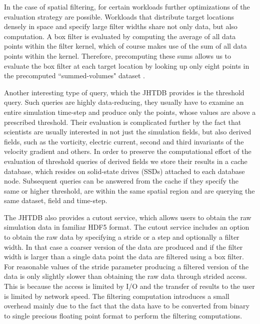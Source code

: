 \documentclass[10pt,twocolumn]{article}
\begin{document}
In the case of spatial filtering, for certain workloads further optimizations of the evaluation strategy are possible. Workloads that distribute target locations
densely in space and specify large filter widths share not only data, but also computation. A box filter is evaluated by computing the average of all data
points within the filter kernel, which of course makes use of the sum of all data points within the kernel. Therefore, precomputing these sums allows us to
evaluate the box filter at each target location by looking up only eight points in the precomputed ``summed-volumes" dataset \cite{KanovSC12}.

Another interesting type of query, which the JHTDB provides is the threshold query. Such queries are highly data-reducing, they usually have to examine an
entire simulation time-step and produce only the points, whose values are above a prescribed threshold. Their evaluation is complicated further by the fact
that scientists are usually interested in not just the simulation fields, but also derived fields, such as the vorticity, electric current, second and third invariants
of the velocity gradient and others. In order to preserve the computational effort of the evaluation of threshold queries of derived fields we store their results
in a cache database, which resides on solid-state drives (SSDs) attached to each database node. Subsequent queries can be answered from the cache
if they specify the same or higher threshold, are within the same spatial region and are querying the same dataset, field and time-step.

The JHTDB also provides a cutout service, which allows users to obtain the raw simulation data in familiar HDF5 format. The cutout service includes an
option to obtain the raw data by specifying a stride or a step and optionally a filter width. 
In that case a coarser version of the data are produced and if the filter width is larger than a single data point the data are filtered using a box filter. 
For reasonable values of the stride parameter producing a filtered version of the data is only slightly slower than obtaining the raw data through strided access.  
This is because the access is limited by I/O and the transfer of results to the user is limited by network speed. 
The filtering computation introduces a small overhead mainly due to the fact that the data have to be converted
from binary to single precious floating point format to perform the filtering computations.
\end{document}
